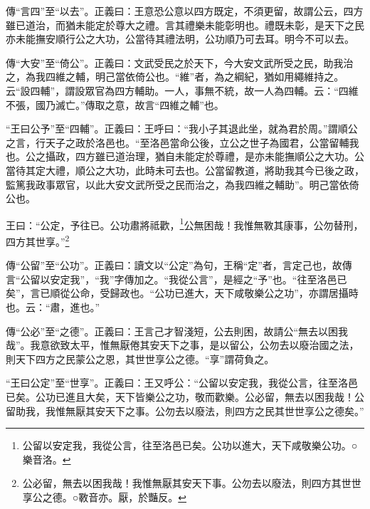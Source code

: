 {\noindent\zhuan{}\fzbyks 傳“言四”至“以去”。正義曰：王意恐公意以四方既定，不須更留，故謂公云，四方雖已道治，而猶未能定於尊大之禮。言其禮樂未能彰明也。禮既未彰，是天下之民亦未能撫安順行公之大功，公當待其禮法明，公功順乃可去耳。明今不可以去。 \par}

{\noindent\zhuan{}\fzbyks 傳“大安”至“倚公”。正義曰：文武受民之於天下，今大安文武所受之民，助我治之，為我四維之輔，明己當依倚公也。“維”者，為之綱紀，猶如用繩維持之。云“設四輔”，謂設眾官為四方輔助。一人，事無不統，故一人為四輔。云：“四維不張，國乃滅亡。”傳取之意，故言“四維之輔”也。 \par}

{\noindent\shu{}\fzkt “王曰公予”至“四輔”。正義曰：王呼曰：“我小子其退此坐，就為君於周。”謂順公之言，行天子之政於洛邑也。“至洛邑當命公後，立公之世子為國君，公當留輔我也。公之攝政，四方雖已道治理，猶自未能定於尊禮，是亦未能撫順公之大功。公當待其定大禮，順公之大功，此時未可去也。公當留教道，將助我其今已後之政，監篤我政事眾官，以此大安文武所受之民而治之，為我四維之輔助”。明己當依倚公也。 \par}

王曰：“公定，予往已。公功肅將祗歡，\footnote{公留以安定我，我從公言，往至洛邑已矣。公功以進大，天下咸敬樂公功。○樂音洛。}公無困哉！我惟無斁其康事，公勿替刑，四方其世享。”\footnote{公必留，無去以困我哉！我惟無厭其安天下事。公勿去以廢法，則四方其世世享公之德。○斁音亦。厭，於豔反。}


{\noindent\zhuan{}\fzbyks 傳“公留”至“公功”。正義曰：讀文以“公定”為句，王稱“定”者，言定己也，故傳言“公留以安定我”，“我”字傳加之。“我從公言”，是經之“予”也。“往至洛邑已矣”，言已順從公命，受歸政也。“公功已進大，天下咸敬樂公之功”，亦謂居攝時也。云：“肅，進也。” \par}

{\noindent\zhuan{}\fzbyks 傳“公必”至“之德”。正義曰：王言己才智淺短，公去則困，故請公“無去以困我哉”。我意欲致太平，惟無厭倦其安天下之事，是以留公，公勿去以廢治國之法，則天下四方之民蒙公之恩，其世世享公之德。“享”謂荷負之。 \par}

{\noindent\shu{}\fzkt “王曰公定”至“世享”。正義曰：王又呼公：“公留以安定我，我從公言，往至洛邑已矣。公功已進且大矣，天下皆樂公之功，敬而歡樂。公必留，無去以困我哉！公留助我，我惟無厭其安天下之事。公勿去以廢法，則四方之民其世世享公之德矣。” \par}

